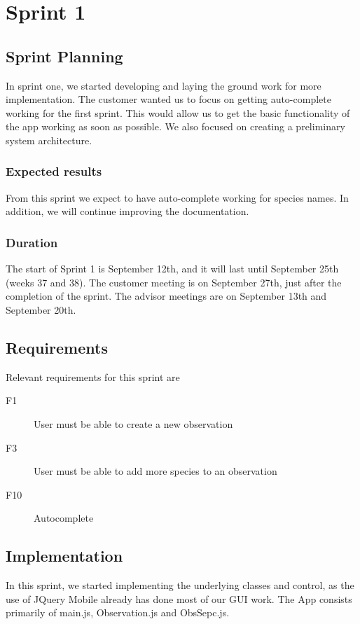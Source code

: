 \section{Sprint 1}

\subsection{Sprint Planning}

	In sprint one, we started developing and laying the ground work for more implementation. The customer wanted us to focus on getting auto-complete working for the first sprint. This would allow us to get the basic functionality of the app working as soon as possible. We also focused on creating a preliminary system architecture.

\subsubsection{Expected results}
 From this sprint we expect to have auto-complete working for species names. In addition, we will continue improving the documentation.
	
\subsubsection{Duration}
The start of Sprint 1 is September 12th, and it will last until September 25th (weeks 37 and 38). The customer meeting is on September 27th, just after the completion of the sprint. The advisor meetings are on September 13th and September 20th.
	
\subsection{Requirements}

Relevant requirements for this sprint are
\begin{description}
	\item[F1] User must be able to create a new observation
	\item[F3] User must be able to add more species to an observation
	\item[F10] Autocomplete
\end{description}

\subsection{Implementation}
In this sprint, we started implementing the underlying classes and control, as the use of JQuery Mobile already has done most of our GUI work. The App consists primarily of main.js, Observation.js and ObsSepc.js.

